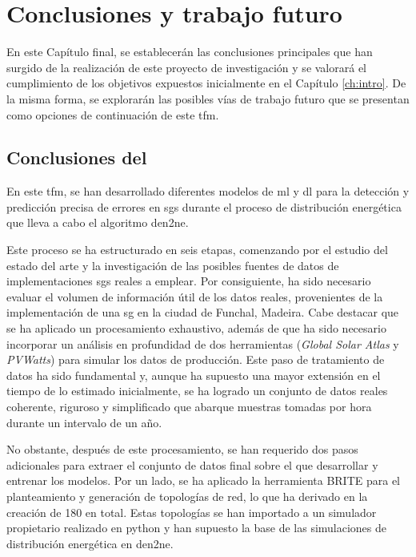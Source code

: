 \chapter{Conclusiones y trabajo futuro}
\label{conclusiones}

En este Capítulo final, se establecerán las conclusiones principales que han surgido de la realización de este proyecto de investigación y se valorará el cumplimiento de los objetivos expuestos inicialmente en el Capítulo \ref{ch:intro}. De la misma forma, se explorarán las posibles vías de trabajo futuro que se presentan como opciones de continuación de este \gls{tfm}.


\section{Conclusiones del }

En este \gls{tfm}, se han desarrollado diferentes modelos de \gls{ml} y \gls{dl} para la detección y predicción precisa de errores en \gls{sg}s durante el proceso de distribución energética que lleva a cabo el algoritmo \gls{den2ne}. 

\vspace{3mm}

Este proceso se ha estructurado en seis etapas, comenzando por el estudio del estado del arte y la investigación de las posibles fuentes de datos de implementaciones \gls{sg}s reales a emplear. Por consiguiente, ha sido necesario evaluar el volumen de información útil de los datos reales, provenientes de la implementación de una \gls{sg} en la ciudad de Funchal, Madeira. Cabe destacar que se ha aplicado un procesamiento exhaustivo, además de que ha sido necesario incorporar un análisis en profundidad de dos herramientas (\textit{Global Solar Atlas} y \textit{PVWatts}) para simular los datos de producción. Este paso de tratamiento de datos ha sido fundamental y, aunque ha supuesto una mayor extensión en el tiempo de lo estimado inicialmente, se ha logrado un conjunto de datos reales coherente, riguroso y simplificado que abarque muestras tomadas por hora durante un intervalo de un año.

\vspace{3mm}

No obstante, después de este procesamiento, se han requerido dos pasos adicionales para extraer el conjunto de datos final sobre el que desarrollar y entrenar los modelos. Por un lado, se ha aplicado la herramienta BRITE para el planteamiento y generación de topologías de red, lo que ha derivado en la creación de 180 en total. Estas topologías se han importado a un simulador propietario realizado en python y han supuesto la base de las simulaciones de distribución energética en \gls{den2ne}. 

